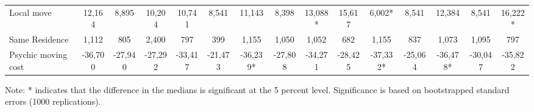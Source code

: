 \begin{table}[ht]
{\begin{footnotesize}
\begin{threeparttable}
\begin{tabular}{lcc|cc|cc|cc|cc|cc|cc}
Local move              &    12,164 &     8,895 &    10,204 &    10,741 &     8,541 &    11,143 &     8,398 &    13,088* &    15,617 &     6,002* &     8,541 &    12,384 &     8,541 &    16,222*  \\ 
Same Residence          &     1,112 &       805 &     2,400 &       797 &       399 &     1,155 &     1,050 &     1,052 &       682 &     1,155 &       837 &     1,073 &     1,095 &       797  \\ 
Psychic moving cost     &   -36,700 &   -27,940 &   -27,292 &   -33,417 &   -21,473 &   -36,239* &   -27,808 &   -34,271 &   -28,425 &   -37,332* &   -25,064 &   -36,478* &   -30,047 &   -35,822  \\ 
\bottomrule 
\end{tabular} 
\footnotesize{Note: * indicates that the difference in the medians is significant at the 5 percent level. Significance is based on bootstrapped standard errors (1000 replications).} 
\end{threeparttable} 
\end{footnotesize} 
} 
\end{table} 
